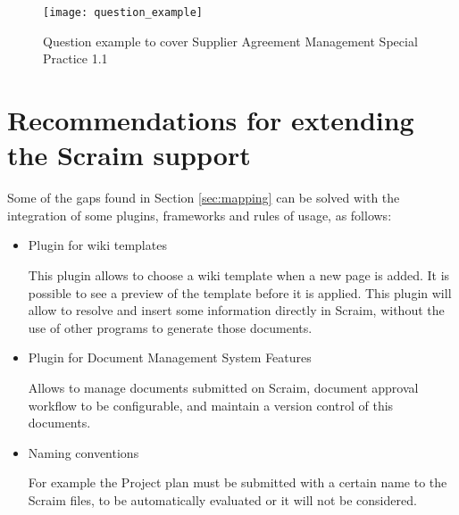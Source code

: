 \begin{figure}[!htb]
	\begin{center}
		\leavevmode
		\texttt{[image: question\_example]}
		\caption{Question example to cover Supplier Agreement Management Special Practice 1.1}
		\label{fig:question_example}
	\end{center}
\end{figure}

\section{Recommendations for extending the Scraim support}

Some of the gaps found in Section \ref{sec:mapping} can be solved with the integration of some plugins, frameworks and rules of usage, as follows:

\begin{itemize}
	\item Plugin for wiki templates \citep{wikitemplates}
	
	This plugin allows to choose a wiki template when a new page is added. It is possible to see a preview of the template before it is applied.
	This plugin will allow to resolve and insert some information directly in Scraim, without the use of other programs to generate those documents.
	
	\item Plugin for Document Management System Features \citep{DMSF}
	
	Allows to manage documents submitted on Scraim, document approval workflow to be configurable, and maintain a version control of this documents.
	
	\item Naming conventions
	
	For example the Project plan must be submitted with a certain name to the Scraim files, to be automatically evaluated or it will not be considered.
	
\end{itemize}